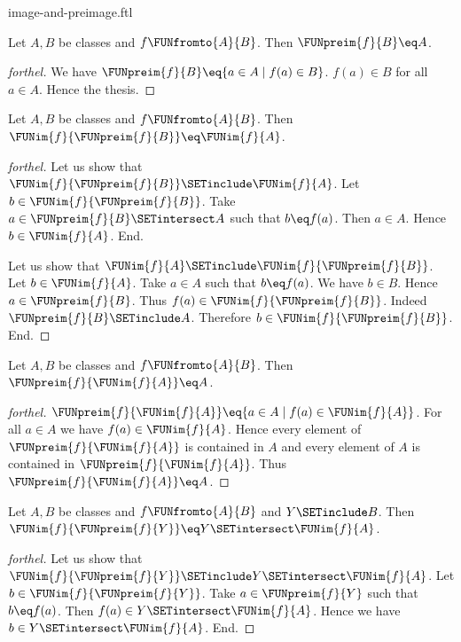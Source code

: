 \documentclass{naproche-library}
\begin{document}
\begin{smodule}[title=Computation Laws for Images and Preimages]{image-and-preimage.ftl}
\begin{proposition}[forthel,id=FOUNDATIONS_07_6541963008409600]
  Let $A, B$ be classes and $f \FUNfromto{A}{B}$.
  Then $\FUNpreim{f}{B} \eq A$.
\end{proposition}
\begin{proof}[forthel]
  We have $\FUNpreim{f}{B} \eq \{ a \in A \mid f(a) \in B \}$.
  $f(a) \in B$ for all $a \in A$.
  Hence the thesis.
\end{proof}

\begin{proposition}[forthel,id=FOUNDATIONS_07_1913313581596672]
  Let $A, B$ be classes and $f \FUNfromto{A}{B}$.
  Then $\FUNim{f}{\FUNpreim{f}{B}} \eq \FUNim{f}{A}$.
\end{proposition}
\begin{proof}[forthel]
  Let us show that $\FUNim{f}{\FUNpreim{f}{B}} \SETinclude \FUNim{f}{A}$.
    Let $b \in \FUNim{f}{\FUNpreim{f}{B}}$.
    Take $a \in \FUNpreim{f}{B} \SETintersect A$ such that $b \eq f(a)$.
    Then $a \in A$.
    Hence $b \in \FUNim{f}{A}$.
  End.

  Let us show that $\FUNim{f}{A} \SETinclude \FUNim{f}{\FUNpreim{f}{B}}$.
    Let $b \in \FUNim{f}{A}$.
    Take $a \in A$ such that $b \eq f(a)$.
    We have $b \in B$.
    Hence $a \in \FUNpreim{f}{B}$.
    Thus $f(a) \in \FUNim{f}{\FUNpreim{f}{B}}$.
    Indeed $\FUNpreim{f}{B} \SETinclude A$.
    Therefore $b \in \FUNim{f}{\FUNpreim{f}{B}}$.
  End.
\end{proof}

\begin{proposition}[forthel,id=FOUNDATIONS_07_3819758101200896]
  Let $A, B$ be classes and $f \FUNfromto{A}{B}$.
  Then $\FUNpreim{f}{\FUNim{f}{A}} \eq A$.
\end{proposition}
\begin{proof}[forthel]
  $\FUNpreim{f}{\FUNim{f}{A}} \eq \{ a \in A \mid f(a) \in \FUNim{f}{A} \}$.
  For all $a \in A$ we have $f(a) \in \FUNim{f}{A}$.
  Hence every element of $\FUNpreim{f}{\FUNim{f}{A}}$ is contained in $A$ and every element of $A$ is contained in $\FUNpreim{f}{\FUNim{f}{A}}$.
  Thus $\FUNpreim{f}{\FUNim{f}{A}} \eq A$.
\end{proof}

\begin{proposition}[forthel,id=FOUNDATIONS_07_7760514696347648]
  Let $A, B$ be classes and $f \FUNfromto{A}{B}$ and $Y \SETinclude B$.
  Then $\FUNim{f}{\FUNpreim{f}{Y}} \eq Y \SETintersect \FUNim{f}{A}$.
\end{proposition}
\begin{proof}[forthel]
  Let us show that $\FUNim{f}{\FUNpreim{f}{Y}} \SETinclude Y \SETintersect \FUNim{f}{A}$.
    Let $b \in \FUNim{f}{\FUNpreim{f}{Y}}$.
    Take $a \in \FUNpreim{f}{Y}$ such that $b \eq f(a)$.
    Then $f(a) \in Y \SETintersect \FUNim{f}{A}$.
    Hence we have $b \in Y \SETintersect \FUNim{f}{A}$.
  End.


\end{proof}
\end{smodule}
\end{document}
